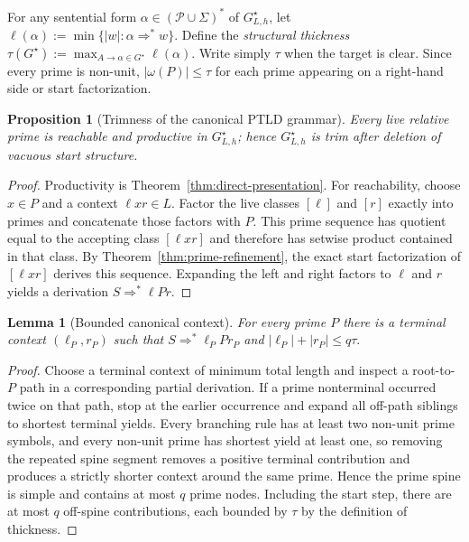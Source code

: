 \documentclass[11pt,a4paper]{article}
\newtheorem{lemma}[theorem]{Lemma}
\newtheorem{proposition}[theorem]{Proposition}
\newcommand{\Pcal}{\mathcal P}
\begin{document}
For any sentential form $\alpha\in(\Pcal\cup\Sigma)^*$ of $G^\star_{L,h}$, let
\(\ell(\alpha):=\min\{|w|:\alpha\Rightarrow^*w\}.\)
Define the \emph{structural thickness}
\(\tau(G^\star):= \max_{A\to\alpha\in G^\star}\ell(\alpha).\)
Write simply $\tau$ when the target is clear.  Since every prime is non-unit, $|\omega(P)|\le\tau$ for each prime appearing on a right-hand side or start factorization.

\begin{proposition}[Trimness of the canonical PTLD grammar]
\label{prop:trim}
Every live relative prime is reachable and productive in $G^\star_{L,h}$; hence $G^\star_{L,h}$ is trim after deletion of vacuous start structure.
\end{proposition}

\begin{proof}
Productivity is Theorem~\ref{thm:direct-presentation}.  For reachability, choose $x\in P$ and a context $\ell x r\in L$.  Factor the live classes $[\ell]$ and $[r]$ exactly into primes and concatenate those factors with $P$.  This prime sequence has quotient equal to the accepting class $[\ell x r]$ and therefore has setwise product contained in that class.  By Theorem~\ref{thm:prime-refinement}, the exact start factorization of $[\ell x r]$ derives this sequence.  Expanding the left and right factors to $\ell$ and $r$ yields a derivation $S\Rightarrow^*\ell P r$.
\end{proof}

\begin{lemma}[Bounded canonical context]
\label{lem:bounded-context}
For every prime $P$ there is a terminal context $(\ell_P,r_P)$ such that
\(S\Rightarrow^*\ell_P P r_P\)
and
\(|\ell_P|+|r_P|\le q\tau.\)
\end{lemma}

\begin{proof}
Choose a terminal context of minimum total length and inspect a root-to-$P$ path in a corresponding partial derivation.  If a prime nonterminal occurred twice on that path, stop at the earlier occurrence and expand all off-path siblings to shortest terminal yields.  Every branching rule has at least two non-unit prime symbols, and every non-unit prime has shortest yield at least one, so removing the repeated spine segment removes a positive terminal contribution and produces a strictly shorter context around the same prime.  Hence the prime spine is simple and contains at most $q$ prime nodes.  Including the start step, there are at most $q$ off-spine contributions, each bounded by $\tau$ by the definition of thickness.
\end{proof}
\end{document}
